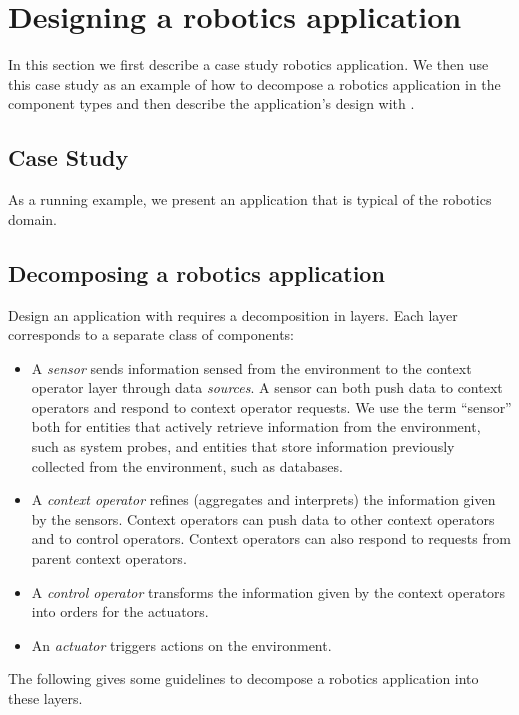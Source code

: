 \section{Designing a robotics application}
\label{sec:designing}

In this section we first describe a case study robotics application.
We then use this case study as an example of how to decompose a
robotics application in the \diaspec{} component types and then
describe the application's design with \diaspec{}.

\subsection{Case Study}

As a running example, we present an application that is typical of the
robotics domain.

\subsection{Decomposing a robotics application}

Design an application with \diaspec{} requires a decomposition in
layers. Each layer corresponds to a separate class of components:

\begin{itemize}
\item A \emph{sensor} sends information sensed from the environment to
  the context operator layer through data \emph{sources}. A sensor can
  both push data to context operators and respond to context operator
  requests. We use the term ``sensor'' both for entities that actively
  retrieve information from the environment, such as system probes,
  and entities that store information previously collected from the
  environment, such as databases.
\item A \emph{context operator} refines (aggregates and interprets)
  the information given by the sensors. Context operators can push
  data to other context operators and to control operators. Context
  operators can also respond to requests from parent context
  operators.
\item A \emph{control operator} transforms the information given by
  the context operators into orders for the actuators.
\item An \emph{actuator} triggers actions on the environment.
\end{itemize}

The following gives some guidelines to decompose a robotics
application into these layers. 

